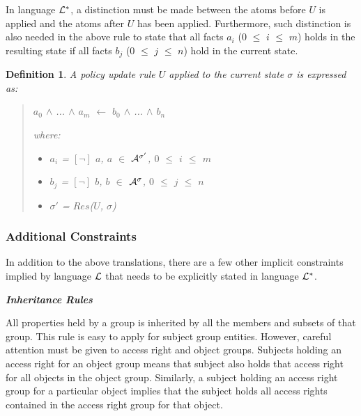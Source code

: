 \documentclass[10pt, twocolumn]{article}
\newtheorem{definition}{Definition}
\begin{document}
          In language ${\cal L}^{*}$, a distinction must be made between the
          atoms before $U$ is applied and the atoms after $U$ has been applied.
          Furthermore, such distinction is also needed in the above rule to
          state that all facts $a_{i}$ ($0$ $\leq$ $i$ $\leq$ $m$) holds in
          the resulting state if all facts $b_{j}$ ($0$ $\leq$ $j$ $\leq$ $n$)
          hold in the current state.

          \begin{definition}
            A policy update rule $U$ applied to the current state $\sigma$ is
            expressed as:

            \begin{quote}
              $a_{0}$ $\land$ ... $\land$ $a_{m}$ $\leftarrow$ $b_{0}$ $\land$ ... $\land$ $b_{n}$

              where:

              \begin{itemize}
                \item
                  $a_{i}$ = $[\lnot]$ $a$, $a$ $\in$ ${\cal A}^{\sigma'}$, $0$ $\leq$ $i$ $\leq$ $m$
                \item
                  $b_{j}$ = $[\lnot]$ $b$, $b$ $\in$ ${\cal A}^{\sigma}$, $0$ $\leq$ $j$ $\leq$ $n$
                \item
                  $\sigma'$ = $Res$($U$, $\sigma$)
              \end{itemize}
            \end{quote}
          \end{definition}

      \subsubsection{Additional Constraints}

        In addition to the above translations, there are a few other implicit
        constraints implied by language ${\cal L}$ that needs to be explicitly
        stated in language ${\cal L}^{*}$.

        \noindent \textbf{\emph{Inheritance Rules}}

          All properties held by a group is inherited by all the members and
          subsets of that group. This rule is easy to apply for subject group
          entities. However, careful attention must be given to access right
          and object groups. Subjects holding an access right for an object
          group means that subject also holds that access right for all objects
          in the object group. Similarly, a subject holding an access right
          group for a particular object implies that the subject holds
          all access rights contained in the access right group for that
          object.
\end{document}
